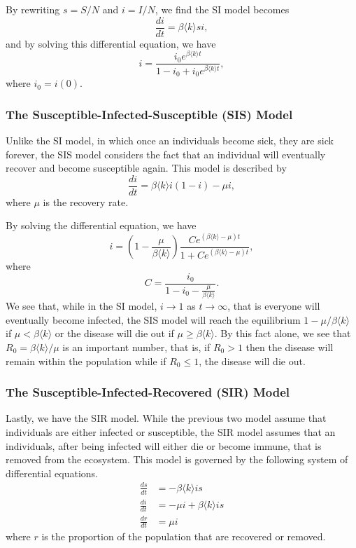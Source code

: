 \documentclass[
]{article}
\theoremstyle{definition}
\theoremstyle{definition}
\begin{document}
By rewriting \(s = S / N\) and \(i = I / N\), we find the SI model
becomes \[\frac{di}{dt} = \beta \langle k \rangle si,\] and by solving
this differential equation, we have
\[i = \frac{i_0 e^{\beta\langle k \rangle t}}{1 - i_0 + i_0 e^{\beta\langle k \rangle t}},\]
where \(i_0 = i(0)\).

\hypertarget{the-susceptible-infected-susceptible-sis-model}{%
\subsubsection{The Susceptible-Infected-Susceptible (SIS)
Model}\label{the-susceptible-infected-susceptible-sis-model}}

Unlike the SI model, in which once an individuals become sick, they are
sick forever, the SIS model considers the fact that an individual will
eventually recover and become susceptible again. This model is described
by \[\frac{di}{dt} = \beta \langle k \rangle i(1 - i) - \mu i,\] where
\(\mu\) is the recovery rate.

By solving the differential equation, we have
\[i = \left(1 - \frac{\mu}{\beta \langle k \rangle}\right)
  \frac{Ce^{(\beta\langle k \rangle - \mu)t}}{1 +Ce^{(\beta\langle k \rangle - \mu)t}},\]
where \[C = \frac{i_0}{1 - i_0 - \frac{\mu}{\beta \langle k \rangle}}.\]
We see that, while in the SI model, \(i \to 1\) as \(t \to \infty\),
that is everyone will eventually become infected, the SIS model will
reach the equilibrium \(1 - \mu / \beta \langle k \rangle\) if
\(\mu < \beta \langle k \rangle\) or the disease will die out if
\(\mu \ge \beta \langle k \rangle\). By this fact alone, we see that
\(R_0 = \beta \langle k \rangle / \mu\) is an important number, that is,
if \(R_0 > 1\) then the disease will remain within the population while
if \(R_0 \le 1\), the disease will die out.

\hypertarget{the-susceptible-infected-recovered-sir-model}{%
\subsubsection{The Susceptible-Infected-Recovered (SIR)
Model}\label{the-susceptible-infected-recovered-sir-model}}

Lastly, we have the SIR model. While the previous two model assume that
individuals are either infected or susceptible, the SIR model assumes
that an individuals, after being infected will either die or become
immune, that is removed from the ecosystem. This model is governed by
the following system of differential equations. \begin{align*}
  \frac{ds}{dt} & = -\beta \langle k \rangle is\\
  \frac{di}{dt} & = - \mu i + \beta \langle k \rangle is\\
  \frac{dr}{dt} & = \mu i
\end{align*} where \(r\) is the proportion of the population that are
recovered or removed.
\end{document}
